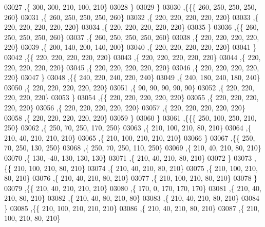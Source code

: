 \begin{DoxyCode}
03027     ,\{   300,   300,   210,   100,   210\}
03028     \}
03029    \}
03030   ,\{\{\{   260,   250,   250,   250,   260\}
03031     ,\{   260,   250,   250,   250,   260\}
03032     ,\{   220,   220,   220,   220,   220\}
03033     ,\{   220,   220,   220,   220,   220\}
03034     ,\{   220,   220,   220,   220,   220\}
03035     \}
03036    ,\{\{   260,   250,   250,   250,   260\}
03037     ,\{   260,   250,   250,   250,   260\}
03038     ,\{   220,   220,   220,   220,   220\}
03039     ,\{   200,   140,   200,   140,   200\}
03040     ,\{   220,   220,   220,   220,   220\}
03041     \}
03042    ,\{\{   220,   220,   220,   220,   220\}
03043     ,\{   220,   220,   220,   220,   220\}
03044     ,\{   220,   220,   220,   220,   220\}
03045     ,\{   220,   220,   220,   220,   220\}
03046     ,\{   220,   220,   220,   220,   220\}
03047     \}
03048    ,\{\{   240,   220,   240,   220,   240\}
03049     ,\{   240,   180,   240,   180,   240\}
03050     ,\{   220,   220,   220,   220,   220\}
03051     ,\{    90,    90,    90,    90,    90\}
03052     ,\{   220,   220,   220,   220,   220\}
03053     \}
03054    ,\{\{   220,   220,   220,   220,   220\}
03055     ,\{   220,   220,   220,   220,   220\}
03056     ,\{   220,   220,   220,   220,   220\}
03057     ,\{   220,   220,   220,   220,   220\}
03058     ,\{   220,   220,   220,   220,   220\}
03059     \}
03060    \}
03061   ,\{\{\{   250,   100,   250,   210,   250\}
03062     ,\{   250,    70,   250,   170,   250\}
03063     ,\{   210,   100,   210,    80,   210\}
03064     ,\{   210,    40,   210,   210,   210\}
03065     ,\{   210,   100,   210,   210,   210\}
03066     \}
03067    ,\{\{   250,    70,   250,   130,   250\}
03068     ,\{   250,    70,   250,   110,   250\}
03069     ,\{   210,    40,   210,    80,   210\}
03070     ,\{   130,   -40,   130,   130,   130\}
03071     ,\{   210,    40,   210,    80,   210\}
03072     \}
03073    ,\{\{   210,   100,   210,    80,   210\}
03074     ,\{   210,    40,   210,    80,   210\}
03075     ,\{   210,   100,   210,    80,   210\}
03076     ,\{   210,    40,   210,    80,   210\}
03077     ,\{   210,   100,   210,    80,   210\}
03078     \}
03079    ,\{\{   210,    40,   210,   210,   210\}
03080     ,\{   170,     0,   170,   170,   170\}
03081     ,\{   210,    40,   210,    80,   210\}
03082     ,\{   210,    40,    80,   210,    80\}
03083     ,\{   210,    40,   210,    80,   210\}
03084     \}
03085    ,\{\{   210,   100,   210,   210,   210\}
03086     ,\{   210,    40,   210,    80,   210\}
03087     ,\{   210,   100,   210,    80,   210\}

\end{DoxyCode}
